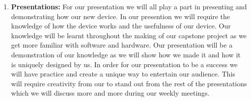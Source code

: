 \documentclass[12pt]{article}
\begin{document}
\begin{enumerate}
  \newpage
  
  \item \textbf{Presentations:} For our presentation we will all play a part in presenting and demonstrating how our new device. In our presention we will require the knowledge of how the device works and the usefulness of our device. Our knowledge will be learnt throughout the making of our capstone project as we get more familiar with software and hardware. Our presentation will be a demonstration of our knowledge as we will show how we made it and how it is uniquely designed by us. In order for our presentation to be a success we will have practice and create a unique way to entertain our audience. This will require creativity from our to stand out from the rest of the presentations which we will discuss more and more during our weekly meetings.
  
\end{enumerate}
\end{document}
